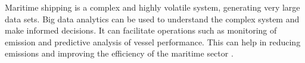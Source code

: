 Maritime shipping is a complex and highly volatile system, generating very large data sets.
Big data analytics can be used to understand the complex system and make informed decisions.
It can facilitate operations such as monitoring of emission and predictive analysis of vessel performance.
This can help in reducing emissions and improving the efficiency of the maritime sector \autocite{ZAMAN2017537}.





